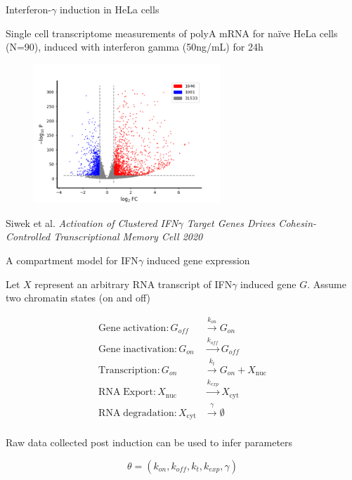 \documentclass[aspectratio=1610]{beamer}					%
\begin{document}
\begin{frame}{Interferon-$\gamma$ induction in HeLa cells}

\vspace{0.1in}
Single cell transcriptome measurements of polyA mRNA for naïve HeLa cells (N=90), induced with interferon gamma (50ng/mL) for 24h

\begin{figure}
\includegraphics[width=7cm]{volcano.png}
\end{figure}

{\tiny Siwek et al. 
\it{Activation of Clustered IFN$\gamma$ Target Genes Drives Cohesin-Controlled Transcriptional Memory} Cell 2020}

\end{frame}

\begin{frame}{A compartment model for IFN$\gamma$ induced gene expression}

Let $X$ represent an arbitrary RNA transcript of IFN$\gamma$ induced gene $G$. Assume two chromatin states (on and off)

\begin{align*}
\mathrm{Gene\;activation}: G_{off} &\overset{k_{on}}{\rightarrow} G_{on}\\
\mathrm{Gene\;inactivation}: G_{on} &\overset{k_{off}}{\rightarrow} G_{off}\\
\mathrm{Transcription}: G_{on} &\overset{k_{t}}{\rightarrow} G_{on} + X_{\mathrm{nuc}}\\
\mathrm{RNA \;Export}: X_{\mathrm{nuc}} &\overset{k_{exp}}{\rightarrow} X_{\mathrm{cyt}}\\
\mathrm{RNA\; degradation}: X_{\mathrm{cyt}} &\overset{\gamma}{\rightarrow} \emptyset\\
\end{align*}

Raw data collected post induction can be used to infer parameters

\begin{equation*}
\theta = \left( k_{on},k_{off},k_{t},k_{exp},\gamma\right)
\end{equation*}

\end{frame}
\end{document}

